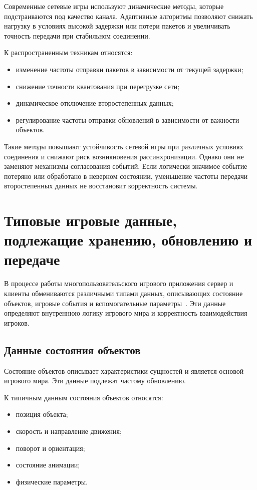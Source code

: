 Современные сетевые игры используют динамические методы, которые подстраиваются под качество канала. Адаптивные алгоритмы позволяют снижать нагрузку в условиях высокой задержки или потери пакетов и увеличивать точность передачи при стабильном соединении.

К распространенным техникам относятся:
\begin{itemize}
	\item изменение частоты отправки пакетов в зависимости от текущей задержки;
	\item снижение точности квантования при перегрузке сети;
	\item динамическое отключение второстепенных данных;
	\item регулирование частоты отправки обновлений в зависимости от важности объектов.
\end{itemize}

Такие методы повышают устойчивость сетевой игры при различных условиях соединения и снижают риск возникновения рассинхронизации. Однако они не заменяют механизмы согласования событий. Если логически значимое событие потеряно или обработано в неверном состоянии, уменьшение частоты передачи второстепенных данных не восстановит корректность системы.

\section{Типовые игровые данные, подлежащие хранению, обновлению и передаче}

В процессе работы многопользовательского игрового приложения сервер и клиенты обмениваются различными типами данных, описывающих состояние объектов, игровые события и вспомогательные параметры~\cite{gregory2018gamedev}. Эти данные определяют внутреннюю логику игрового мира и корректность взаимодействия игроков.

\subsection{Данные состояния объектов}

Состояние объектов описывает характеристики сущностей и является основой игрового мира. Эти данные подлежат частому обновлению.

К типичным данным состояния объектов относятся:
\begin{itemize}
	\item позиция объекта;
	\item скорость и направление движения;
	\item поворот и ориентация;
	\item состояние анимации;
	\item физические параметры.
\end{itemize}

